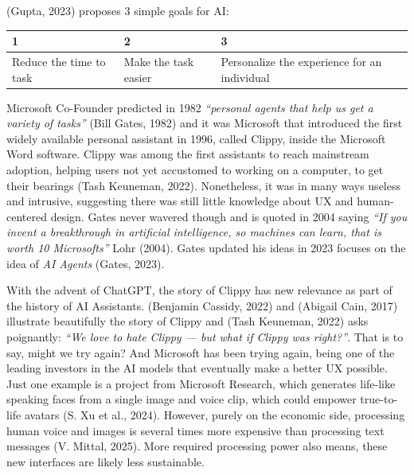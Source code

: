 \documentclass[
  letterpaper,
  DIV=11,
  numbers=noendperiod]{scrartcl}
\begin{document}
(Gupta, 2023) proposes 3 simple goals for AI:

\begin{longtable}[]{@{}
  >{\raggedright\arraybackslash}p{}
  >{\raggedright\arraybackslash}p{}
  >{\raggedright\arraybackslash}p{}@{}}
\toprule\noalign{}
\begin{minipage}[b]{\linewidth}\raggedright
1
\end{minipage} & \begin{minipage}[b]{\linewidth}\raggedright
2
\end{minipage} & \begin{minipage}[b]{\linewidth}\raggedright
3
\end{minipage} \\
\midrule\noalign{}
\endhead
\bottomrule\noalign{}
\endlastfoot
Reduce the time to task & Make the task easier & Personalize the
experience for an individual \\
\end{longtable}

Microsoft Co-Founder predicted in 1982 \emph{``personal agents that help
us get a variety of tasks''} (Bill Gates, 1982) and it was Microsoft
that introduced the first widely available personal assistant in 1996,
called Clippy, inside the Microsoft Word software. Clippy was among the
first assistants to reach mainstream adoption, helping users not yet
accustomed to working on a computer, to get their bearings (Tash
Keuneman, 2022). Nonetheless, it was in many ways useless and intrusive,
suggesting there was still little knowledge about UX and human-centered
design. Gates never wavered though and is quoted in 2004 saying
\emph{``If you invent a breakthrough in artificial intelligence, so
machines can learn, that is worth 10 Microsofts''} Lohr (2004). Gates
updated his ideas in 2023 focuses on the idea of \emph{AI Agents}
(Gates, 2023).

With the advent of ChatGPT, the story of Clippy has new relevance as
part of the history of AI Assistants. (Benjamin Cassidy, 2022) and
(Abigail Cain, 2017) illustrate beautifully the story of Clippy and
(Tash Keuneman, 2022) asks poignantly: \emph{``We love to hate Clippy
--- but what if Clippy was right?''}. That is to say, might we try
again? And Microsoft has been trying again, being one of the leading
investors in the AI models that eventually make a better UX possible.
Just one example is a project from Microsoft Research, which generates
life-like speaking faces from a single image and voice clip, which could
empower true-to-life avatars (S. Xu et al., 2024). However, purely on
the economic side, processing human voice and images is several times
more expensive than processing text messages (V. Mittal, 2025). More
required processing power also means, these new interfaces are likely
less sustainable.
\end{document}
